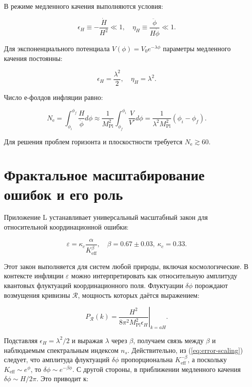 \documentclass[11pt,a4paper]{article}
\newcommand{\eps}{\varepsilon}
\newcommand{\kappac}{\kappa_c}
\newcommand{\Keff}{K_{\mathrm{eff}}}
\newcommand{\Mpl}{M_{\mathrm{Pl}}}
\newcommand{\ninf}{N_{\mathrm{e}}}
\begin{document}
	В режиме медленного качения выполняются условия:
	
	\begin{equation}
		\epsilon_H \equiv -\frac{\dot{H}}{H^2} \ll 1, \quad \eta_H \equiv \frac{\ddot{\phi}}{H\dot{\phi}} \ll 1.
	\end{equation}
	
	Для экспоненциального потенциала \(V(\phi) = V_0 e^{-\lambda \phi}\) параметры медленного качения постоянны:
	
	\begin{equation}
		\epsilon_H = \frac{\lambda^2}{2}, \quad \eta_H = \lambda^2.
		\label{eq:slowroll}
	\end{equation}
	
	Число е-фолдов инфляции равно:
	
	\begin{equation}
		\ninf = \int_{\phi_i}^{\phi_f} \frac{H}{\dot{\phi}} d\phi \approx \frac{1}{\Mpl^2} \int_{\phi_f}^{\phi_i} \frac{V}{V'} d\phi = \frac{1}{\lambda^2 \Mpl^2} (\phi_i - \phi_f).
	\end{equation}
	
	Для решения проблем горизонта и плоскостности требуется \(\ninf \gtrsim 60\).
	
	\section{Фрактальное масштабирование ошибок и его роль}
	\label{sec:fractal}
	
	Приложение L устанавливает универсальный масштабный закон для относительной координационной ошибки:
	
	\begin{equation}
		\eps = \kappac \frac{\alpha}{\Keff^{\beta}}, \quad \beta = 0.67 \pm 0.03,\ \kappac = 0.33.
		\label{eq:error-scaling}
	\end{equation}
	
	Этот закон выполняется для систем любой природы, включая космологические. В контексте инфляции \(\eps\) можно интерпретировать как относительную амплитуду квантовых флуктуаций координационного поля. Флуктуации \(\delta \phi\) порождают возмущения кривизны \(\mathcal{R}\), мощность которых даётся выражением:
	
	\begin{equation}
		P_{\mathcal{R}}(k) = \left. \frac{H^2}{8\pi^2 \Mpl^2 \epsilon_H} \right|_{k=aH}.
	\end{equation}
	
	Подставляя \(\epsilon_H = \lambda^2/2\) и выражая \(\lambda\) через \(\beta\), получаем связь между \(\beta\) и наблюдаемым спектральным индексом \(n_s\). Действительно, из (\ref{eq:error-scaling}) следует, что амплитуда флуктуаций \(\delta \phi\) пропорциональна \(\Keff^{-\beta}\), а поскольку \(\Keff \sim e^{\phi}\), то \(\delta \phi \sim e^{-\beta \phi}\). С другой стороны, в приближении медленного качения \(\delta \phi \sim H/2\pi\). Это приводит к:
	
\end{document}

